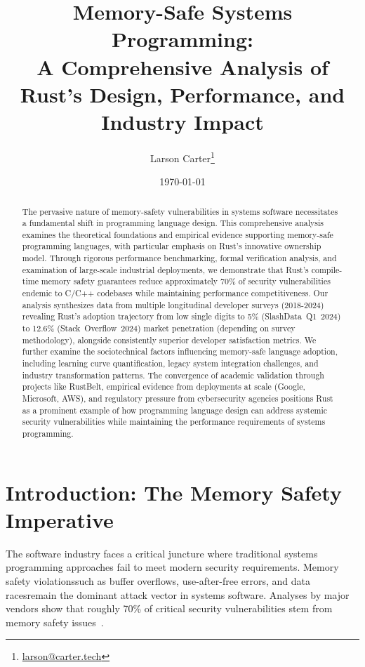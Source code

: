 \documentclass[11pt]{article}
\title{Memory-Safe Systems Programming:\\A Comprehensive Analysis of Rust's Design, Performance, and Industry Impact}
\author{Larson Carter\thanks{\href{mailto:larson@carter.tech}{larson@carter.tech}}}
\date{\today}
\begin{document}
\maketitle
\begin{abstract}
The pervasive nature of memory-safety vulnerabilities in systems software necessitates a fundamental shift in programming language design. This comprehensive analysis examines the theoretical foundations and empirical evidence supporting memory-safe programming languages, with particular emphasis on Rust's innovative ownership model. Through rigorous performance benchmarking, formal verification analysis, and examination of large-scale industrial deployments, we demonstrate that Rust's compile-time memory safety guarantees reduce approximately 70\% of security vulnerabilities endemic to C/C++ codebases while maintaining performance competitiveness. Our analysis synthesizes data from multiple longitudinal developer surveys (2018-2024) revealing Rust's adoption trajectory from low single digits to 5\% (SlashData Q1 2024) to 12.6\% (Stack Overflow 2024) market penetration (depending on survey methodology), alongside consistently superior developer satisfaction metrics. We further examine the sociotechnical factors influencing memory-safe language adoption, including learning curve quantification, legacy system integration challenges, and industry transformation patterns. The convergence of academic validation through projects like RustBelt, empirical evidence from deployments at scale (Google, Microsoft, AWS), and regulatory pressure from cybersecurity agencies positions Rust as a prominent example of how programming language design can address systemic security vulnerabilities while maintaining the performance requirements of systems programming.
\end{abstract}

\tableofcontents
\newpage

\section{Introduction: The Memory Safety Imperative}

The software industry faces a critical juncture where traditional systems programming approaches fail to meet modern security requirements. Memory safety violations\textemdash such as buffer overflows, use-after-free errors, and data races\textemdash remain the dominant attack vector in systems software. Analyses by major vendors show that roughly 70\% of critical security vulnerabilities stem from memory safety issues~\cite{msrc2019survey,google2022android}.
\end{document}

